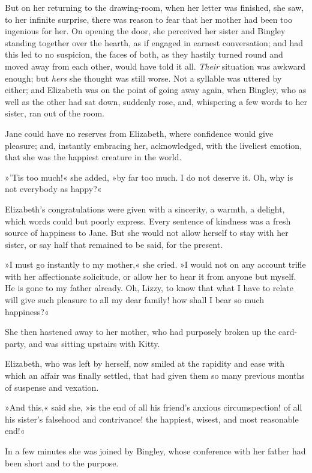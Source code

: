 But on her returning to the drawing-room, when her letter was finished, she saw, to her infinite surprise, there was reason to fear that her mother had been too ingenious for her. On opening the door, she perceived her sister and Bingley standing together over the hearth, as if engaged in earnest conversation; and had this led to no suspicion, the faces of both, as they hastily turned round and moved away from each other, would have told it all. \textit{Their} situation was awkward enough; but \textit{hers} she thought was still worse. Not a syllable was uttered by either; and Elizabeth was on the point of going away again, when Bingley, who as well as the other had sat down, suddenly rose, and, whispering a few words to her sister, ran out of the room.

Jane could have no reserves from Elizabeth, where confidence would give pleasure; and, instantly embracing her, acknowledged, with the liveliest emotion, that she was the happiest creature in the world.

»'Tis too much!« she added, »by far too much. I do not deserve it. Oh, why is not everybody as happy?«

Elizabeth's congratulations were given with a sincerity, a warmth, a delight, which words could but poorly express. Every sentence of kindness was a fresh source of happiness to Jane. But she would not allow herself to stay with her sister, or say half that remained to be said, for the present.

»I must go instantly to my mother,« she cried. »I would not on any account trifle with her affectionate solicitude, or allow her to hear it from anyone but myself. He is gone to my father already. Oh, Lizzy, to know that what I have to relate will give such pleasure to all my dear family! how shall I bear so much happiness?«

She then hastened away to her mother, who had purposely broken up the card-party, and was sitting upstairs with Kitty.

Elizabeth, who was left by herself, now smiled at the rapidity and ease with which an affair was finally settled, that had given them so many previous months of suspense and vexation.

»And this,« said she, »is the end of all his friend's anxious circumspection! of all his sister's falsehood and contrivance! the happiest, wisest, and most reasonable end!«

In a few minutes she was joined by Bingley, whose conference with her father had been short and to the purpose.

